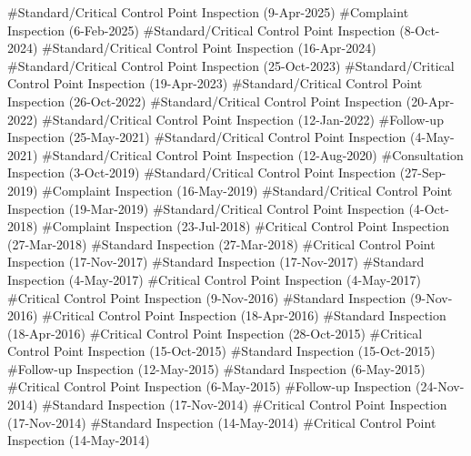 \documentclass[
]{article}
\author{}
\date{\vspace{-2.5em}}
\begin{document}
\#Standard/Critical Control Point Inspection (9-Apr-2025) \#Complaint
Inspection (6-Feb-2025) \#Standard/Critical Control Point Inspection
(8-Oct-2024) \#Standard/Critical Control Point Inspection (16-Apr-2024)
\#Standard/Critical Control Point Inspection (25-Oct-2023)
\#Standard/Critical Control Point Inspection (19-Apr-2023)
\#Standard/Critical Control Point Inspection (26-Oct-2022)
\#Standard/Critical Control Point Inspection (20-Apr-2022)
\#Standard/Critical Control Point Inspection (12-Jan-2022) \#Follow-up
Inspection (25-May-2021) \#Standard/Critical Control Point Inspection
(4-May-2021) \#Standard/Critical Control Point Inspection (12-Aug-2020)
\#Consultation Inspection (3-Oct-2019) \#Standard/Critical Control Point
Inspection (27-Sep-2019) \#Complaint Inspection (16-May-2019)
\#Standard/Critical Control Point Inspection (19-Mar-2019)
\#Standard/Critical Control Point Inspection (4-Oct-2018) \#Complaint
Inspection (23-Jul-2018) \#Critical Control Point Inspection
(27-Mar-2018) \#Standard Inspection (27-Mar-2018) \#Critical Control
Point Inspection (17-Nov-2017) \#Standard Inspection (17-Nov-2017)
\#Standard Inspection (4-May-2017) \#Critical Control Point Inspection
(4-May-2017) \#Critical Control Point Inspection (9-Nov-2016) \#Standard
Inspection (9-Nov-2016) \#Critical Control Point Inspection
(18-Apr-2016) \#Standard Inspection (18-Apr-2016) \#Critical Control
Point Inspection (28-Oct-2015) \#Critical Control Point Inspection
(15-Oct-2015) \#Standard Inspection (15-Oct-2015) \#Follow-up Inspection
(12-May-2015) \#Standard Inspection (6-May-2015) \#Critical Control
Point Inspection (6-May-2015) \#Follow-up Inspection (24-Nov-2014)
\#Standard Inspection (17-Nov-2014) \#Critical Control Point Inspection
(17-Nov-2014) \#Standard Inspection (14-May-2014) \#Critical Control
Point Inspection (14-May-2014)
\end{document}
